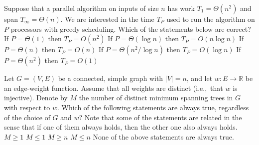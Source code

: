 Suppose that a parallel algorithm on inputs of size $n$ has work $T_1=\Theta(n^2)$ and span $T_\infty=\Theta(n)$.
We are interested in the time $T_P$ used to run the algorithm on $P$ processors with greedy scheduling.
Which of the statements below are correct?
\multipleanswers
\optionsstart
\answer If $P=\Theta(1)$ then $T_P=O(n^2)$ \correct
\answer If $P=\Theta(\log n)$ then $T_P=O(n \log n)$
\answer If $P=\Theta(n)$ then $T_P=O(n)$ \correct
\answer If $P=\Theta(n^2/\log n)$ then $T_P=O(\log n)$
\answer If $P=\Theta(n^2)$ then $T_P=O(1)$
\optionsend
{}




Let $G = (V,E)$ be a connected, simple graph with $|V|=n$, and let $w : E \to \mathbb{R}$ be an edge-weight function.
Assume that all weights are distinct (i.e.,~that $w$ is injective).
Denote by $M$ the number of distinct minimum spanning trees in $G$ with respect to $w$.
Which of the following statements are always true, regardless of the choice of $G$ and $w$?
\multipleanswers
Note that some of the statements are related in the sense that if one of them always holds, then the other one also always holds.
\optionsstart
\answer $M \geq 1$ \correct
\answer $M \leq 1$ \correct
\answer $M \geq n$
\answer $M \leq n$ \correct
\answer None of the above statements are always true.
\optionsend
{}



